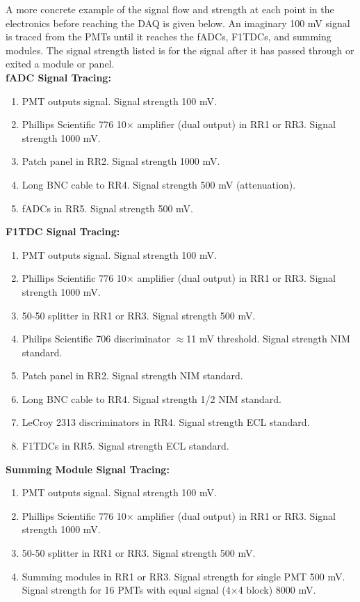 \documentclass[10pt]{article}
\begin{document}
	A more concrete example of the signal flow and strength at each point in the electronics before reaching the DAQ is given below. An imaginary 100 mV signal is traced from the PMTs until it reaches the fADCs, F1TDCs, and summing modules. The signal strength listed is for the signal after it has passed through or exited a module or panel. \\
	
	\noindent \textbf{fADC Signal Tracing:}
	\begin{enumerate}
		\item PMT outputs signal. Signal strength 100 mV.
		\item Phillips Scientific 776 10$\times$ amplifier (dual output) in RR1 or RR3. Signal strength 1000 mV.
		\item Patch panel in RR2. Signal strength 1000 mV.
		\item Long BNC cable to RR4. Signal strength 500 mV (attenuation).
		\item fADCs in RR5. Signal strength 500 mV.
	\end{enumerate}
	
\noindent \textbf{F1TDC Signal Tracing:}
	\begin{enumerate}
		\item PMT outputs signal. Signal strength 100 mV.
		\item Phillips Scientific 776 10$\times$ amplifier (dual output) in RR1 or RR3. Signal strength 1000 mV.
		\item 50-50 splitter in RR1 or RR3. Signal strength 500 mV.
		\item Philips Scientific 706 discriminator $\approx$11 mV threshold. Signal strength NIM standard.
		\item Patch panel in RR2. Signal strength NIM standard.
		\item Long BNC cable to RR4. Signal strength 1/2 NIM standard.
		\item LeCroy 2313 discriminators in RR4. Signal strength ECL standard.
		\item F1TDCs in RR5. Signal strength ECL standard.
	\end{enumerate}
	
\noindent \textbf{Summing Module Signal Tracing:}
	\begin{enumerate}
		\item PMT outputs signal. Signal strength 100 mV.
		\item Phillips Scientific 776 10$\times$ amplifier (dual output) in RR1 or RR3. Signal strength 1000 mV.
		\item 50-50 splitter in RR1 or RR3. Signal strength 500 mV.
		\item Summing modules in RR1 or RR3. Signal strength for single PMT 500 mV. Signal strength for 16 PMTs with equal signal (4$\times$4 block) 8000 mV.
	\end{enumerate}
	
\end{document}

